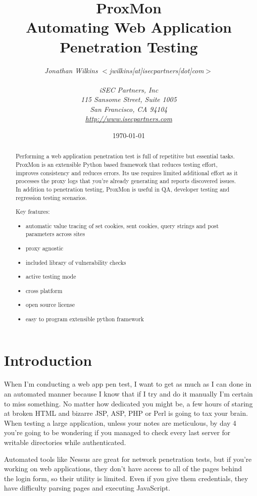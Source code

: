 \documentclass{article}
\title{\bf ProxMon\\
Automating Web Application Penetration Testing}
\author{\em Jonathan Wilkins $<$jwilkins[at]isecpartners[dot]com$>$\\
\\
iSEC Partners, Inc\\
115 Sansome Street, Suite 1005\\
San Francisco, CA 94104\\
\url{http://www.isecpartners.com}\\
}
\date{\today}
\begin{document}
\maketitle
\thispagestyle{fancy}
\begin{abstract}
Performing a web application penetration test is full of repetitive but 
essential tasks.  ProxMon is an extensible Python based framework that 
reduces testing effort, improves consistency and reduces errors.  Its use 
requires limited additional effort as it processes the proxy logs that you're
already generating and reports discovered issues.  In addition to penetration 
testing, ProxMon is useful in QA, developer testing and regression testing scenarios.

Key features:
\begin{itemize}
\item{automatic value tracing of set cookies, sent cookies, query strings and post parameters across sites}
\item{proxy agnostic}
\item{included library of vulnerability checks}
\item{active testing mode}
\item{cross platform}
\item{open source license}
\item{easy to program extensible python framework}
\end{itemize}
\end{abstract}

\section{Introduction}
When I'm conducting a web app pen test, I want to get as much as I can done in 
an automated manner because I know that if I try and do
it manually I'm certain to miss something.  No matter how dedicated you might be, 
a few hours of staring at broken HTML and bizarre JSP, ASP, PHP or Perl is going to 
tax your brain.  When testing a large application, unless your notes are
meticulous, by day 4 you're going to be wondering if you managed to check
every last server for writable directories while authenticated.

Automated tools like Nessus are great for network penetration tests, but if you're
working on web applications, they don't have access to all of the pages behind the
login form, so their utility is limited.  Even if you give them credentials, they
have difficulty parsing pages and executing JavaScript.
\end{document}

